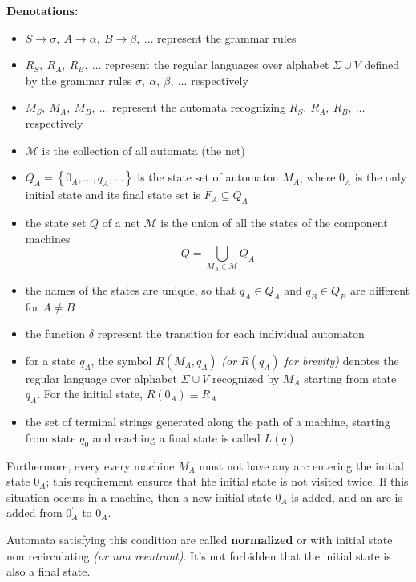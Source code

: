\documentclass[english]{article}
\begin{document}
\textbf{Denotations:}
\begin{itemize}
  \item \(S \rightarrow \sigma, \ A \rightarrow \alpha, \ B \rightarrow \beta, \ \ldots\) represent the grammar rules
  \item \(R_S, \ R_A, \ R_B, \ \ldots\) represent the regular languages over alphabet \(\Sigma \cup V\) defined by the grammar rules \(\sigma, \ \alpha, \ \beta, \ \ldots\) respectively
  \item \(M_S, \ M_A, \ M_B, \ \ldots\) represent the automata recognizing \(R_S, \ R_A, \ R_B, \ \ldots\) respectively
  \item \(\mathcal{M}\) is the collection of all automata (the net)
  \item \(Q_A = \left\{ 0_A, \ldots, q_A, \ldots \right\}\) is the state set of automaton \(M_A\), where \(0_A\) is the only initial state and its final state set is \(F_A \subseteq Q_A\)
  \item the state set \(Q\) of a net \(\mathcal{M}\) is the union of all the states of the component machines \[Q = \displaystyle \bigcup_{M_A \in \mathcal{M}} Q_A\]
  \item the names of the states are unique, so that \(q_A \in Q_A\) and \(q_B \in Q_B\) are different for \(A \neq B\)
  \item the function \(\delta\) represent the transition for each individual automaton
  \item for a state \(q_A\), the symbol \(R (M_A, q_A)\) \textit{(or \(R(q_A)\) for brevity)} denotes the regular language over alphabet \(\Sigma \cup V\) recognized by \(M_A\) starting from state \(q_A\). For the initial state, \(R(0_A) \equiv R_A\)
  \item the set of terminal strings generated along the path of a machine, starting from state \(q_0\) and reaching a final state is called \(L(q)\)
\end{itemize}

Furthermore, every every machine \(M_A\) must not have any arc entering the initial state \(0_A\); this requirement ensures that hte initial state is not visited twice.
If this situation occurs in a machine, then a new initial state \(0_A\) is added, and an arc is added from \(0^\prime_A\) to \(0_A\).

Automata satisfying this condition are called \textbf{normalized} or with initial state non recirculating \textit{(or non reentrant)}.
It's not forbidden that the initial state is also a final state.
\end{document}
